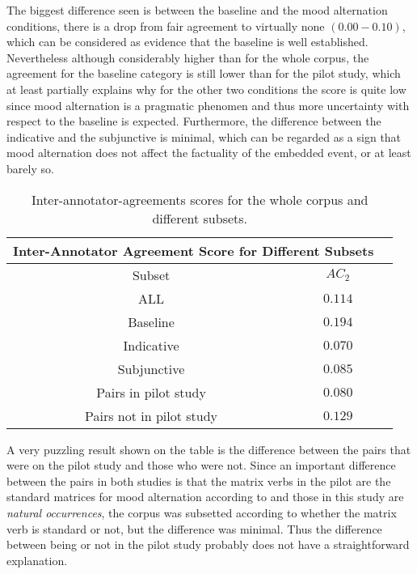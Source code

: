 The biggest difference seen is between the baseline and the mood alternation conditions, there is a drop from fair agreement to virtually none $(0.00-0.10)$, which can be considered as evidence that the baseline is well established. Nevertheless although considerably higher than for the whole corpus, the agreement for the baseline category is still lower than for the pilot study, which at least partially explains why for the other two conditions the score is quite low since mood alternation is a pragmatic phenomen and thus more uncertainty with respect to the baseline is expected. Furthermore, the difference between the indicative and the subjunctive is minimal, which can be regarded as a sign that mood alternation does not affect the factuality of the embedded event, or at least barely so.\\

\begin{table}
\center
\begin{tabular}{|c|c|c|}
\hline
\multicolumn{2}{|c|}{Inter-Annotator Agreement Score for Different Subsets}\\\hline
                     Subset & $AC_2$\\\hline 
ALL & $0.114$\\\hline 
Baseline & $0.194$\\\hline
Indicative & $0.070$ \\\hline
Subjunctive & $ 0.085$\\\hline
Pairs in pilot study & $0.080$ \\\hline
Pairs not in pilot study & $ 0.129$\\\hline
\end{tabular}
\caption[Ac2 subsets.]{Inter-annotator-agreements scores for the whole corpus and different subsets.}
\label{tab:iaa}
\end{table}

A very puzzling result shown on the table is the difference between the pairs that were on the pilot study and those who were not. Since an important difference between the pairs in both studies is that the matrix verbs in the pilot are the standard matrices for mood alternation according to \citet{espanola2010nueva} and those in this study are \textit{natural occurrences}, the corpus was subsetted according to whether the matrix verb is standard or not, but the difference was minimal. Thus the difference between being or not in the pilot study probably does not have a straightforward explanation.\\


